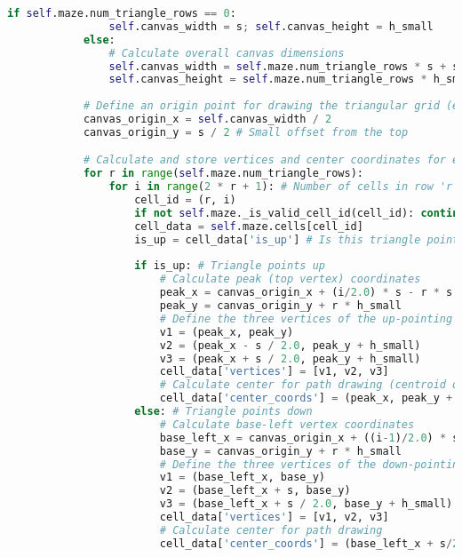\documentclass[UTF8]{report}
\theoremstyle{MyLineTheoremStyle} %
\theoremstyle{MyBlockTheoremStyle} %
\theoremstyle{MySubsubsectionStyle} %
\begin{document}
\begin{lstlisting}[language=Python, caption={迷宫生成与求解程序代码}]
            if self.maze.num_triangle_rows == 0:
                self.canvas_width = s; self.canvas_height = h_small
            else:
                # Calculate overall canvas dimensions
                self.canvas_width = self.maze.num_triangle_rows * s + s # Max width approx.
                self.canvas_height = self.maze.num_triangle_rows * h_small + h_small # Max height approx.
            
            # Define an origin point for drawing the triangular grid (e.g., top-center)
            canvas_origin_x = self.canvas_width / 2 
            canvas_origin_y = s / 2 # Small offset from the top

            # Calculate and store vertices and center coordinates for each triangular cell
            for r in range(self.maze.num_triangle_rows):
                for i in range(2 * r + 1): # Number of cells in row 'r'
                    cell_id = (r, i)
                    if not self.maze._is_valid_cell_id(cell_id): continue
                    cell_data = self.maze.cells[cell_id]
                    is_up = cell_data['is_up'] # Is this triangle pointing up or down?
                    
                    if is_up: # Triangle points up
                        # Calculate peak (top vertex) coordinates
                        peak_x = canvas_origin_x + (i/2.0) * s - r * s / 2.0
                        peak_y = canvas_origin_y + r * h_small
                        # Define the three vertices of the up-pointing triangle
                        v1 = (peak_x, peak_y) 
                        v2 = (peak_x - s / 2.0, peak_y + h_small) 
                        v3 = (peak_x + s / 2.0, peak_y + h_small) 
                        cell_data['vertices'] = [v1, v2, v3]
                        # Calculate center for path drawing (centroid of a triangle)
                        cell_data['center_coords'] = (peak_x, peak_y + h_small * (2.0/3.0))
                    else: # Triangle points down
                        # Calculate base-left vertex coordinates
                        base_left_x = canvas_origin_x + ((i-1)/2.0) * s - r * s / 2.0
                        base_y = canvas_origin_y + r * h_small
                        # Define the three vertices of the down-pointing triangle
                        v1 = (base_left_x, base_y) 
                        v2 = (base_left_x + s, base_y) 
                        v3 = (base_left_x + s / 2.0, base_y + h_small) 
                        cell_data['vertices'] = [v1, v2, v3]
                        # Calculate center for path drawing
                        cell_data['center_coords'] = (base_left_x + s/2.0, base_y + h_small * (1.0/3.0))
        

\end{lstlisting}
\end{document}
